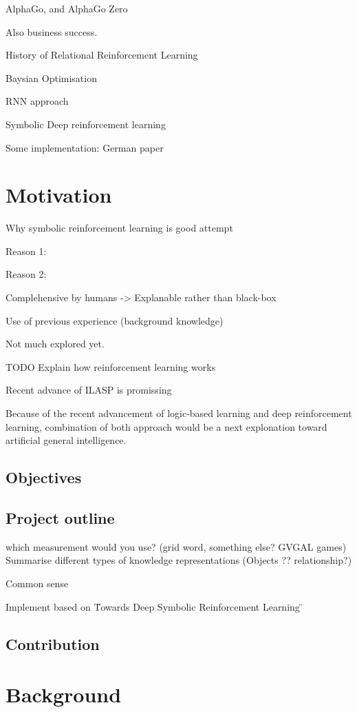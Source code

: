 \documentclass[12pt,twoside]{report}
\begin{document}
AlphaGo, and AlphaGo Zero

Also business success.

History of Relational Reinforcement Learning

Baysian Optimisation

RNN approach

Symbolic Deep reinforcement learning

Some implementation: German paper

\chapter{Motivation}

Why symbolic reinforcement learning is good attempt

Reason 1:

Reason 2:

Complehensive by humans -> Explanable rather than black-box

Use of previous experience (background knowledge)


Not much explored yet.

TODO Explain how reinforcement learning works


Recent advance of ILASP is promissing

Because of the recent advancement of logic-based learning and deep reinforcement learning, combination of both approach would be a next explonation toward artificial general intelligence.


\section{Objectives}

\section{Project outline}


which measurement would you use? (grid word, something else? GVGAL games)
Summarise different types of knowledge representations (Objects ?? relationship?)

Common sense

Implement based on \"Towards Deep Symbolic Reinforcement Learning \"

\section{Contribution}


\chapter{Background}
\end{document}
